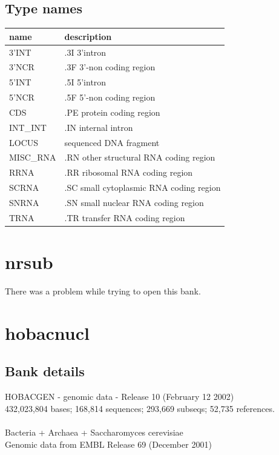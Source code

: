 \documentclass{article}
\begin{document}
\begin{Schunk}
\subsection{Type names}
\noindent\begin{tabular}{ll}
\hline \hline
name & description\\
\hline
3'INT & .3I 3'intron \\
3'NCR & .3F  3'-non coding region \\
5'INT & .5I 5'intron \\
5'NCR & .5F  5'-non coding region \\
CDS & .PE protein coding region \\
INT\_INT & .IN  internal intron \\
LOCUS & sequenced DNA fragment \\
MISC\_RNA & .RN other structural RNA coding region \\
RRNA & .RR ribosomal RNA coding region \\
SCRNA & .SC small cytoplasmic RNA coding region \\
SNRNA & .SN small nuclear RNA coding region \\
TRNA & .TR transfer RNA coding region \\
\hline \hline
\end{tabular}

\section{ nrsub }
There was a problem while trying to open this bank.
\section{ hobacnucl }
\subsection{Bank details}
HOBACGEN - genomic data - Release 10 (February 12 2002)\\
432,023,804 bases; 168,814 sequences; 293,669 subseqs; 52,735 references.\\
\\
Bacteria + Archaea + Saccharomyces cerevisiae\\
Genomic data from EMBL Release 69 (December 2001)\\



\end{Schunk}
\end{document}

